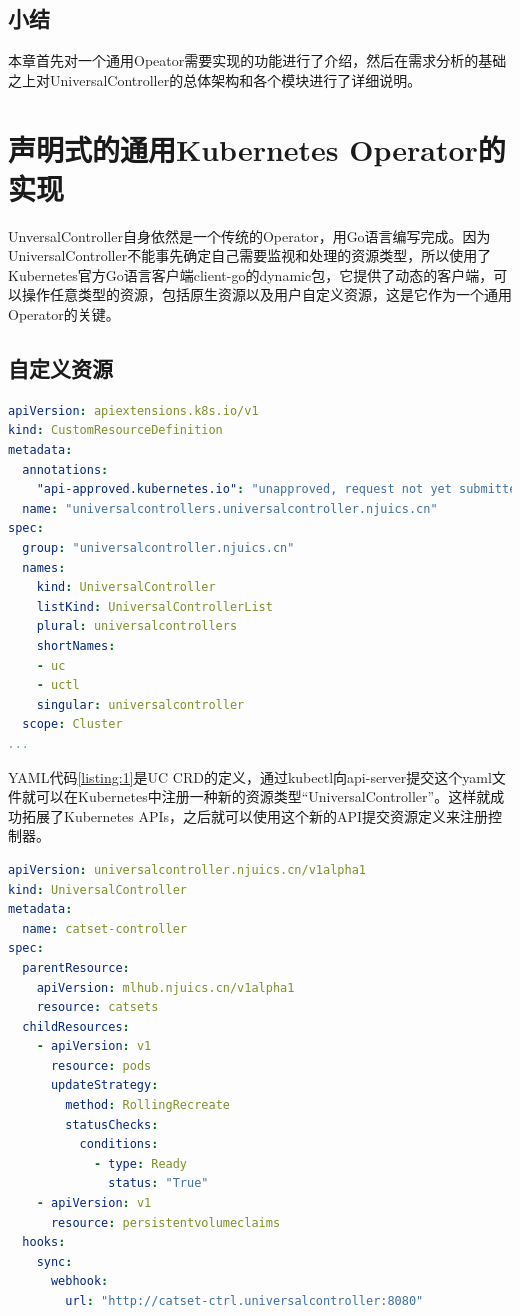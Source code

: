 \documentclass[macfonts,master]{njuthesis}
\begin{document}
\section{小结}

本章首先对一个通用Opeator需要实现的功能进行了介绍，然后在需求分析的基础之上对UniversalController的总体架构和各个模块进行了详细说明。

\chapter{声明式的通用Kubernetes Operator的实现}\label{chapter_implement}
UnversalController自身依然是一个传统的Operator，用Go语言编写完成。因为UniversalController不能事先确定自己需要监视和处理的资源类型，所以使用了Kubernetes官方Go语言客户端client-go的dynamic包，它提供了动态的客户端，可以操作任意类型的资源，包括原生资源以及用户自定义资源，这是它作为一个通用Operator的关键。

\section{自定义资源}

\begin{lstlisting}[language=yaml,caption=UC CRD,label=listing:1]
apiVersion: apiextensions.k8s.io/v1
kind: CustomResourceDefinition
metadata:
  annotations:
    "api-approved.kubernetes.io": "unapproved, request not yet submitted"
  name: "universalcontrollers.universalcontroller.njuics.cn"
spec:
  group: "universalcontroller.njuics.cn"
  names:
    kind: UniversalController
    listKind: UniversalControllerList
    plural: universalcontrollers
    shortNames:
    - uc
    - uctl
    singular: universalcontroller
  scope: Cluster
...
\end{lstlisting}

YAML代码\ref{listing:1}是UC CRD的定义，通过kubectl向api-server提交这个yaml文件就可以在Kubernetes中注册一种新的资源类型“UniversalController”。这样就成功拓展了Kubernetes APIs，之后就可以使用这个新的API提交资源定义来注册控制器。

\begin{lstlisting}[language=yaml,caption=作为UC CRD示例的catset-controlelr,label=listing:ucsample]
apiVersion: universalcontroller.njuics.cn/v1alpha1
kind: UniversalController
metadata:
  name: catset-controller
spec:
  parentResource:
    apiVersion: mlhub.njuics.cn/v1alpha1
    resource: catsets
  childResources:
    - apiVersion: v1
      resource: pods
      updateStrategy:
        method: RollingRecreate
        statusChecks:
          conditions:
            - type: Ready
              status: "True"
    - apiVersion: v1
      resource: persistentvolumeclaims
  hooks:
    sync:
      webhook:
        url: "http://catset-ctrl.universalcontroller:8080"
\end{lstlisting}
\end{document}
